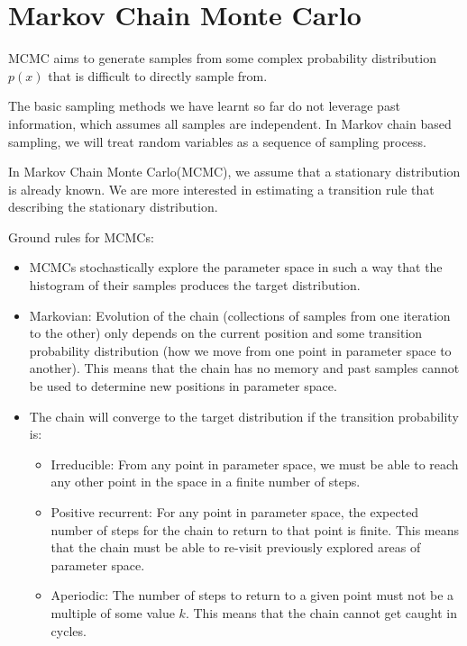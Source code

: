 \section{Markov Chain Monte Carlo}
MCMC aims to generate samples from some complex probability distribution $p(x)$ that is difficult to directly sample from.

The basic sampling methods we have learnt so far do not leverage past information, which assumes all samples are independent. In Markov chain based sampling, we will treat random variables as a sequence of sampling process. 

In Markov Chain Monte Carlo(MCMC), we assume that a stationary distribution is already known. We are more interested in estimating a transition rule that describing the stationary distribution. 



Ground rules for MCMCs:
\begin{itemize}
	\item MCMCs stochastically explore the parameter space in such a way that the histogram of their samples produces the target distribution.
	\item Markovian: Evolution of the chain (\ie collections of samples from one iteration to the other) only depends on the current position and some transition probability distribution (\ie how we move from one point in parameter space to another). This means that the chain has no memory and past samples cannot be used to determine new positions in parameter space.
	\item The chain will converge to the target distribution if the transition probability is:
		\begin{itemize}
			\item Irreducible: From any point in parameter space, we must be able to reach any other point in the space in a finite number of steps.
			\item Positive recurrent: For any point in parameter space, the expected number of steps for the chain to return to that point is finite. This means that the chain must be able to re-visit previously explored areas of parameter space.
			\item Aperiodic: The number of steps to return to a given point must not be a multiple of some value $k$. This means that the chain cannot get caught in cycles.
		\end{itemize}
\end{itemize}




